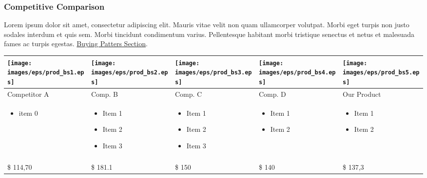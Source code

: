 \documentclass[11pt]{article}
\begin{document}
\subsubsection{Competitive Comparison}
Lorem ipsum dolor sit amet, consectetur adipiscing elit. Mauris vitae velit 
non quam ullamcorper volutpat. Morbi eget turpis non justo sodales interdum 
et quis sem. Morbi tincidunt condimentum varius. Pellentesque habitant morbi 
tristique senectus et netus et malesuada fames ac turpis egestas.\newline
\hyperlink{competition_and_buying_patterns}{Buying Patters Section}.\newline\newline
\begin{tabular}{| m{80 pt} | m{80 pt} | m{80 pt} | m{80 pt} | m{80 pt} |}\hline
	\texttt{[image: images/eps/prod\_bs1.eps]} & 
		\texttt{[image: images/eps/prod\_bs2.eps]} & 
		\texttt{[image: images/eps/prod\_bs3.eps]} & 
		\texttt{[image: images/eps/prod\_bs4.eps]} & 
		\texttt{[image: images/eps/prod\_bs5.eps]} \\ \hline
	Competitor A & Comp. B & Comp. C & Comp. D & Our Product\\ \hline
	\begin{itemize} \tiny \item  item 0\end{itemize} & 
					\begin{itemize} \tiny 
							\item Item 1 
							\item Item 2
							\item Item 3
							\end{itemize} & 
					\begin{itemize} \tiny 
							\item Item 1
							\item Item 2
							\item Item 3 \end{itemize}& 
					\begin{itemize} \tiny 
							\item Item 1
							\item Item 2
							\end{itemize}& 
					\begin{itemize} \tiny 
							\item Item 1
							\item Item 2
							\end{itemize} \\
	& & & &\\ \hline
	\$ 114,70 & \$ 181.1 & \$ 150 & \$ 140 & \$ 137,3\\ \hline
\end{tabular}
\end{document}
